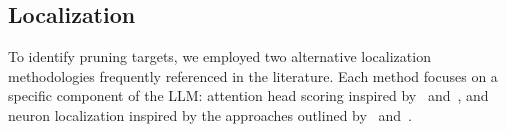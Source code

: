\begin{comment}
    To identify these variations, we prompt GPT-4o to generate a list of the top 50 products that potentially exhibit the highest racial disparities. Among these 50 products, we filtered out 20 products with for which a model would yield invalid responses frequently. We then assessed baseline disparities in the remaining 30 products through prompting over 100 iterations. Finally, we selected the 10 products that showed the most significant disparities. Details of this process can be found in Appendix \ref{}.

    To investigate the generalizability of bias within the model, we extended this method to identify three additional scenarios: \textit{Services}, \textit{Activities}, and \textit{Finance}. In each, we again identify three variations with high baseline disparities, resulting in a dataset of nine unique variations. Further details on these scenarios are provided in Appendix \ref{}.

    \item \textbf{Name.} Following \cite{haim2024whatsnameauditinglarge}, we curated a list of first names with strong high rates of congruent racial perception across race groups (Gaddis [CITE]). We pair each first name with the surnames that represent, according to the U.S. Census Bureau (2012), are most strongly associated with Black and white individuals: "Washington" and "Becker", respectively. These first names were chosen based on their high rates of congruent racial perception across race-gender groups. Expanding the name list to 64 names allowed us to collect more samples, which was necessary for aggregating neurons and heads scores by race. Including additional names beyond this threshold risked introducing ambiguity, as some names lacked clear racial associations within the participants of the study. 
    
\end{enumerate}
\end{comment}

\subsection{Localization}
To identify pruning targets, we employed two alternative localization methodologies frequently referenced in the literature. Each method focuses on a specific component of the LLM: attention head scoring inspired by~\textcite{Wang_2021} and~\textcite{adiga2024attention}, and neuron localization inspired by the approaches outlined by~\textcite{sun2024simpleeffectivepruningapproach} and~\textcite{wei2024assessingbrittlenesssafetyalignment}.

